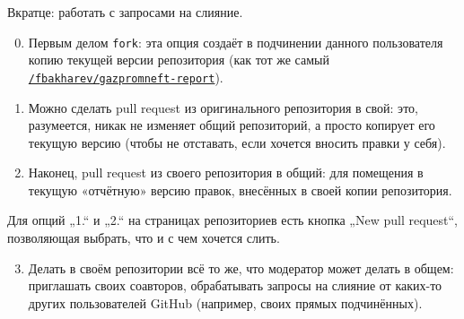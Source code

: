 \documentclass[12pt,a4paper,report]{ncc}
\begin{document}
\ni Вкратце: работать с запросами на слияние.

\begin{enumerate}
\setcounter{enumi}{-1}

\item Первым делом {\tt fork}: эта опция создаёт в подчинении данного пользователя копию текущей версии репозитория (как тот же самый {\tt \href{https://github.com/fbakharev/gazpromneft-report}{/fbakharev/gazpromneft-report}}).

\item Можно сделать pull request из оригинального репозитория в свой: это, разумеется, никак не изменяет общий репозиторий, а просто копирует его текущую версию (чтобы не отставать, если хочется вносить правки у себя).

\item Наконец, pull request из своего репозитория в общий: для помещения в текущую «отчётную» версию правок, внесённых в своей копии репозитория.

\end{enumerate}

Для опций „1.“ и „2.“ на страницах репозиториев есть кнопка „New pull request“, позволяющая выбрать, что и с чем хочется слить.

\begin{enumerate}
\setcounter{enumi}{2}

\item Делать в своём репозитории всё то же, что модератор может делать в общем: приглашать своих соавторов, обрабатывать запросы на слияние от каких-то других пользователей GitHub (например, своих прямых подчинённых).

\end{enumerate}
\end{document}
